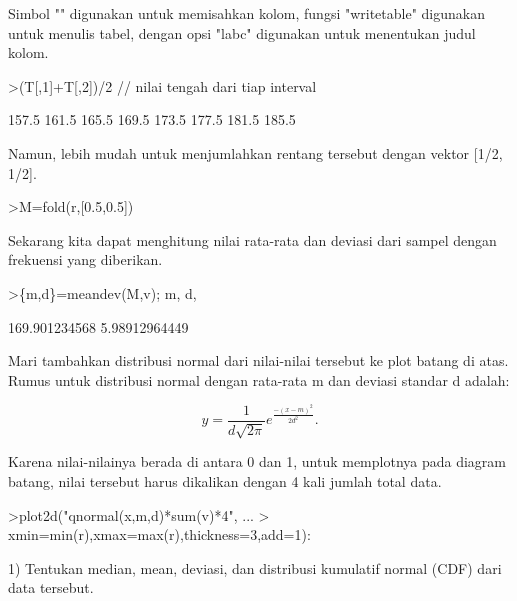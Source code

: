 \documentclass[a4paper,10pt]{article}
\begin{document}
\begin{eulernotebook}
\begin{eulercomment}
Simbol "\textbar{}" digunakan untuk memisahkan kolom, fungsi "writetable"
digunakan untuk menulis tabel, dengan opsi "labc" digunakan untuk
menentukan judul kolom.
\end{eulercomment}
\begin{eulerprompt}
>(T[,1]+T[,2])/2 // nilai tengah dari tiap interval
\end{eulerprompt}
\begin{euleroutput}
          157.5 
          161.5 
          165.5 
          169.5 
          173.5 
          177.5 
          181.5 
          185.5 
\end{euleroutput}
\begin{eulercomment}
Namun, lebih mudah untuk menjumlahkan rentang tersebut dengan vektor
[1/2, 1/2].
\end{eulercomment}
\begin{eulerprompt}
>M=fold(r,[0.5,0.5])
\end{eulerprompt}
\begin{euleroutput}
  [157.5,  161.5,  165.5,  169.5,  173.5,  177.5,  181.5,  185.5]
\end{euleroutput}
\begin{eulercomment}
Sekarang kita dapat menghitung nilai rata-rata dan deviasi dari sampel
dengan frekuensi yang diberikan.
\end{eulercomment}
\begin{eulerprompt}
>\{m,d\}=meandev(M,v); m, d,
\end{eulerprompt}
\begin{euleroutput}
  169.901234568
  5.98912964449
\end{euleroutput}
\begin{eulercomment}
Mari tambahkan distribusi normal dari nilai-nilai tersebut ke plot
batang di atas. Rumus untuk distribusi normal dengan rata-rata m dan
deviasi standar d adalah:

\end{eulercomment}
\begin{eulerformula}
\[
y=\frac{1}{d\sqrt{2\pi}}e^{\frac{-(x-m)^2}{2d^2}}.
\]
\end{eulerformula}
\begin{eulercomment}
Karena nilai-nilainya berada di antara 0 dan 1, untuk memplotnya pada
diagram batang, nilai tersebut harus dikalikan dengan 4 kali jumlah
total data.
\end{eulercomment}
\begin{eulerprompt}
>plot2d("qnormal(x,m,d)*sum(v)*4", ...
>  xmin=min(r),xmax=max(r),thickness=3,add=1):
\end{eulerprompt}
\begin{eulercomment}
1) Tentukan median, mean, deviasi, dan distribusi kumulatif normal
(CDF) dari data tersebut.


\end{eulercomment}
\end{eulernotebook}
\end{document}
